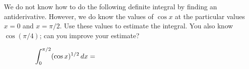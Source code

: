 We do not know how to do the following definite integral by finding an antiderivative.  However, we do know the values of $\cos x$ at the particular values $x=0$ and $x=\pi/2$.  Use these values to estimate the integral.  You also know $\cos(\pi/4)$; can you improve your estimate?

\medskip
  $$\int_0^{\pi/2} (\cos x)^{1/2} \,dx = \hspace{2.5in}$$